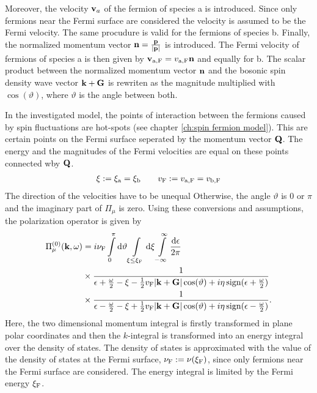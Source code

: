Moreover, the velocity $\vb{v}_{a}$ of the fermion of species a is introduced.
Since only fermions near the Fermi surface are considered the velocity is assumed to be the Fermi velocity.
The same procudure is valid for the fermions of species b.
Finally, the normalized momentum vector $\vb{n} = \frac{\vb{p}}{|\vb{p}|}$ is introduced.
The Fermi velocity of fermions of species a is then given by $\vb{v}_{\mathrm{a,F}} = v_{\mathrm{a,F}} \vb{n}$ and equally for b.
The scalar product between the normalized momentum vector $\vb{n}$ and the bosonic spin density wave vector $\vb{k} + \vb{G}$ is rewriten as the magnitude multiplied with $\cos(\vartheta)$, where $\vartheta$ is the angle between both.

In the investigated model, the points of interaction between the fermions caused by spin fluctuations are hot-spots (see chapter \ref{ch:spin fermion model}).
This are certain points on the Fermi surface seperated by the momentum vector $\vb{Q}$.
The energy and the magnitudes of the Fermi velocities are equal on these points connected wby $\vb{Q}$.
%
\begin{align}
	\xi := \xi_{\mathrm{a}} = \xi_{\mathrm{b}} \qquad v_{\mathrm{F}} := v_{\mathrm{a,F}} = v_{\mathrm{b,F}}
\end{align}
%
The direction of the velocities have to be unequal
Otherwise, the angle $\vartheta$ is $0$ or $\pi$ and the imaginary part of $\Pi_{\mu}$ is zero.
Using these conversions and assumptions, the polarization operator is given by
%
\begin{align}
	\Pi_{\mu}^{(0)}(\vb{k}, \omega) &= 
		i \nu_{\mathrm{F}}
		\int\limits_{0}^{\pi} \dd{\vartheta}
		\int\limits_{\xi \leq \xi_{\mathrm{F}}} \dd{\xi}
		\int\limits_{-\infty}^{\infty} \frac{\dd{\epsilon}}{2\pi}
		\notag \\ &\times
		\frac{1}{\epsilon + \frac{\omega}{2} - \xi - \frac{1}{2} v_{\mathrm{F}} |\vb{k} + \vb{G}| \cos(\vartheta) + i \eta \operatorname{sign}(\epsilon + \frac{\omega}{2})}
		\notag \\ &\times
		\frac{1}{\epsilon - \frac{\omega}{2} - \xi + \frac{1}{2} v_{\mathrm{F}} |\vb{k} + \vb{G}| \cos(\vartheta) + i \eta \operatorname{sign}(\epsilon - \frac{\omega}{2})}.
	\label{appeq:pol operator before epsilon integration}
\end{align}
%
Here, the two dimensional momentum integral is firstly transformed in plane polar coordinates and then the $k$-integral is transformed into an energy integral over the density of states.
The density of states is approximated with the value of the density of states at the Fermi surface, $\nu_{\mathrm{F}} := \nu(\xi_{\mathrm{F}})$, since only fermions near the Fermi surface are considered.
The energy integral is limited by the Fermi energy $\xi_{\mathrm{F}}$.


